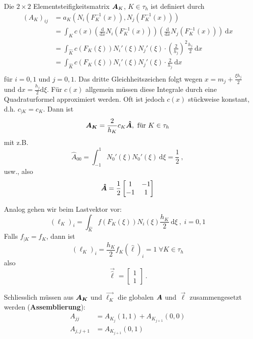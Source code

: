 Die $2 \times 2$ Elementsteifigkeitsmatrix $\boldsymbol{A}_K$, $K \in \tau_h$ ist definiert durch
\begin{align*}
    (A_K)_{ij} &= a_K \left( N_i(F_K^{-1}(x) ), N_j( F_K^{-1}(x)) \right) \\
        &= \int_K c(x) \left( \frac{\mathrm d }{\mathrm dx} N_i(F_K^{-1}(x)) \right) 
        \left( \frac{\mathrm d}{\mathrm dx} N_j(F_K^{-1}(x)) \right) \ \mathrm dx \\
        &= \int_{\hat K} c( F_K(\xi)) N_i'(\xi) N_j'(\xi) \cdot \left(  \frac{2}{h_j} \right)^2 \frac{h_j}{2} \ \mathrm dx \\
        &= \int_{\hat K} c( F_K(\xi)) N_i'(\xi) N_j'(\xi) \cdot   \frac{2}{h_j}  \ \mathrm dx \\
\end{align*}
für $i = 0,1$ und $j=0,1$. Das dritte Gleichheitszeichen folgt wegen $x = m_j + \frac{\xi h_j}{2}$ und 
$\mathrm dx = \frac{h_j}{2} \mathrm d \xi$. Für $c(x)$ allgemein müssen diese Integrale durch eine Quadraturformel
approximiert werden. Oft ist jedoch $c(x)$ stückweise konstant, d.h. $c_{|K} = c_K$. Dann ist 
\[
    \boldsymbol{A_K} = \frac{2}{h_K} c_K \boldsymbol{\hat A}, \text{ für } K \in \tau_h
\]
mit z.B.
\[
    \hat A_{00} = \int_{-1}^1 N_0'(\xi) N_0'(\xi) \ \mathrm d \xi = \frac 1 2 \ ,
\]
usw., also 
\[
    \boldsymbol{\hat A} = \frac 1 2 
    \begin{bmatrix}
        1 & -1 \\
        -1 & 1
    \end{bmatrix}
\]

Analog gehen wir beim Lastvektor vor:
\[
    (\ell_K)_i = \int_{\hat K} f( F_K(\xi)) N_i(\xi) \frac{h_K}{2} \ \mathrm d \xi \ , \; i = 0,1
\]
Falls $f_{|K} = f_K$, dann ist
\[
    (\ell_K)_i = \frac{h_K}{2} f_K( \hat \ell)_i = 1  \; \forall K \in \tau_h
\]
also
\[
\vec{\hat \ell} = \begin{bmatrix} 1 \\ 1 \end{bmatrix} \ .
\]

Schliesslich müssen aus $\boldsymbol{A_K}$ und $\vec{\ell_K}$ die globalen $\boldsymbol{A}$ und $\vec \ell$ zusammengesetzt werden 
(\textbf{Assemblierung}): 
\begin{align*}
    A_{jj} &= A_{K_j}(1,1) + A_{K_{j+1}}(0,0) \\
A_{j,j+1} &= A_{K_{j+1}} (0,1)
\end{align*}
    






